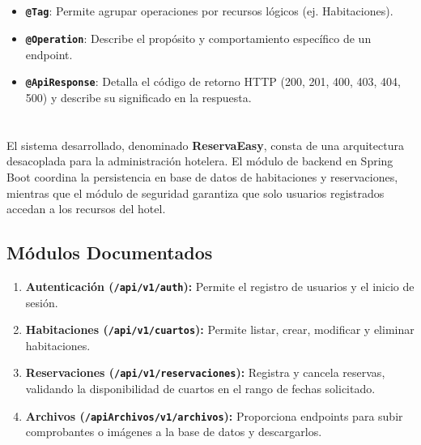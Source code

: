 \documentclass[10pt,a4paper]{article}
\begin{document}
\subsection{\textit{\color{colorESCOM}{Anotaciones de OpenAPI}}}
\begin{itemize}
    \item \textbf{\texttt{@Tag}}: Permite agrupar operaciones por recursos lógicos (ej. Habitaciones).
    \item \textbf{\texttt{@Operation}}: Describe el propósito y comportamiento específico de un endpoint.
    \item \textbf{\texttt{@ApiResponse}}: Detalla el código de retorno HTTP (200, 201, 400, 403, 404, 500) y describe su significado en la respuesta.
\end{itemize}

\pagebreak

\section{\color{colorIPN}{Descripción del sistema}}

El sistema desarrollado, denominado \textbf{ReservaEasy}, consta de una arquitectura desacoplada para la administración hotelera. El módulo de backend en Spring Boot coordina la persistencia en base de datos de habitaciones y reservaciones, mientras que el módulo de seguridad garantiza que solo usuarios registrados accedan a los recursos del hotel.

\subsection{Módulos Documentados}
\begin{enumerate}
    \item \textbf{Autenticación (\texttt{/api/v1/auth}):} Permite el registro de usuarios y el inicio de sesión.
    \item \textbf{Habitaciones (\texttt{/api/v1/cuartos}):} Permite listar, crear, modificar y eliminar habitaciones.
    \item \textbf{Reservaciones (\texttt{/api/v1/reservaciones}):} Registra y cancela reservas, validando la disponibilidad de cuartos en el rango de fechas solicitado.
    \item \textbf{Archivos (\texttt{/apiArchivos/v1/archivos}):} Proporciona endpoints para subir comprobantes o imágenes a la base de datos y descargarlos.
\end{enumerate}
\end{document}
